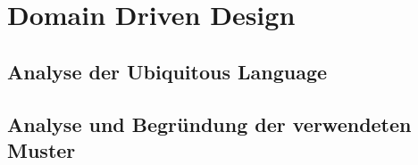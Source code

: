 \chapter{Domain Driven Design}
\label{chapter:domain_driven_design}

\section{Analyse der Ubiquitous Language}
\label{section:analyse_der_ubiquitous_language}


\section{Analyse und Begründung der verwendeten Muster}
\label{section:analyse_und_begrundung_der_verwendeten_muster}